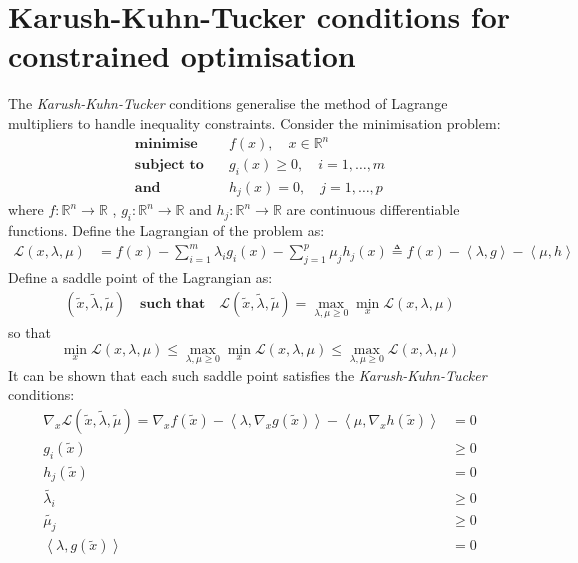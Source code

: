 \documentclass[a4paper,twoside,10pt,english]{report}
\begin{document}
\section{\label{sub:Karush-Kuhn-Tucker-Conditions}Karush-Kuhn-Tucker conditions for constrained optimisation}
The \emph{Karush-Kuhn-Tucker} conditions generalise the method of Lagrange 
multipliers to handle inequality constraints. Consider the minimisation problem:
\begin{align*}
\textbf{minimise}   \quad & f\left(x\right) , \quad x \in \mathbb{R}^{n}\\
\textbf{subject to} \quad & g_{i}\left(x\right) \ge 0 , \quad i=1,\ldots,m\\
\textbf{and}        \quad & h_{j}\left(x\right) = 0 , \quad j=1,\ldots,p
\end{align*}
where $f:\mathbb{R}^{n}\rightarrow\mathbb{R}$ , $g_{i}:\mathbb{R}^{n}\rightarrow\mathbb{R}$
and $h_{j}:\mathbb{R}^{n}\rightarrow\mathbb{R}$ are continuous differentiable
functions. Define the Lagrangian of the problem as:
\begin{align*}
\mathcal{L}\left(x,\lambda,\mu\right) &= f\left(x\right)-\sum_{i=1}^{m}\lambda_{i}g_{i}\left(x\right)-\sum_{j=1}^{p}\mu_{j}h_{j}\left(x\right)\triangleq f\left(x\right)-\left\langle \lambda,g\right\rangle -\left\langle \mu,h\right\rangle 
\end{align*}
Define a saddle point of the Lagrangian as:
\begin{align*}
\left(\tilde{x},\tilde{\lambda},\tilde{\mu}\right) 
\quad \textbf{such that} \quad
\mathcal{L}\left(\tilde{x},\tilde{\lambda},\tilde{\mu}\right) = 
\max_{\lambda,\mu\ge0}\min_{x}\mathcal{L}\left(x,\lambda,\mu\right)
\end{align*}
so that
\[
\min_{x}\mathcal{L}\left(x,\lambda,\mu\right)\le\max_{\lambda,\mu\ge0}\min_{x}\mathcal{L}\left(x,\lambda,\mu\right)\le\max_{\lambda,\mu\ge{}0}\mathcal{L}\left(x,\lambda,\mu\right)
\]
It can be shown that each such saddle point satisfies the 
\emph{Karush-Kuhn-Tucker} conditions:
\begin{align*}
\nabla_{x}\mathcal{L}\left(\tilde{x},\tilde{\lambda},\tilde{\mu}\right)=\nabla_{x}f\left(\tilde{x}\right)-\left\langle \lambda,\nabla_{x}g\left(\tilde{x}\right)\right\rangle -\left\langle \mu,\nabla_{x}h\left(\tilde{x}\right)\right\rangle  &= 0\\
g_{i}\left(\tilde{x}\right) & \ge 0\\
h_{j}\left(\tilde{x}\right) &= 0\\
\tilde{\lambda_{i}} & \ge 0\\
\tilde{\mu_{j}} & \ge 0\\
\left\langle \lambda,g\left(\tilde{x}\right)\right\rangle  &= 0
\end{align*}
\end{document}

